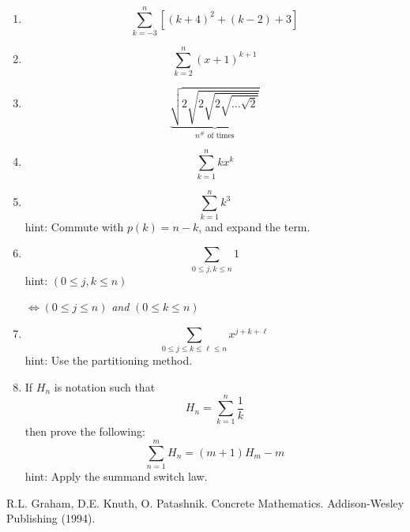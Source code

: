 \documentclass[twoside]{article}
\begin{document}
\begin{enumerate}
\item $$  \sum_{k=-3}^n[(k+4)^2+(k-2)+3]  $$
\item $$  \sum_{k=2}^n(x+1)^{k+1}  $$
\item $$  \underbrace{\sqrt{2\sqrt{2\sqrt{2\sqrt{\ldots\sqrt{2}}}}}}
_{n^{\#}\mbox{ of times}}  $$
\item $$  \sum_{k=1}^nkx^k  $$
\item $$  \sum_{k=1}^nk^3  $$
      hint: Commute with $  p(k)=n-k  $, and expand the term.
\item $$  \sum_{0\le j,k\le n}\!\!\!\! 1  $$
      hint: $  (0\le j,k\le n)  $

      $  \Longleftrightarrow (0\le j\le n) $ 
      \emph{and} $  (0\le k\le n)  $ 
\item $$  \sum_{0\le j\le k\le\ell\le n}\!\!\!\!\!\!\!\! x^{j+k+\ell}  $$
      hint: Use the partitioning method.
\item If $  H_n  $ is notation such that
$$  H_n=\sum_{k=1}^n\frac{1}{k}  $$ then prove the following: 
$$  \sum_{n=1}^mH_n=(m+1)H_m-m  $$
      hint: Apply the summand switch law.
\end{enumerate}

\begin{thebibliography}{99}
 R.L. Graham, D.E. Knuth, O. Patashnik.  Concrete 
         Mathematics.  Addison-Wesley Publishing (1994).
\end{thebibliography}
\end{document}
